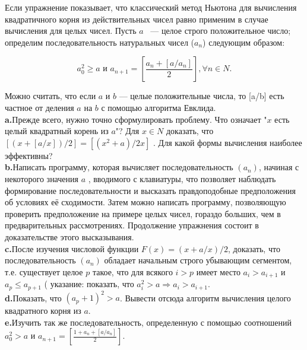 Если упражнение показывает, что классический метод Ньютона для вычисления квадратичного корня из действительных чисел равно применим в случае вычисления для целых чисел. Пусть $a$ ~--- целое строго положительное число; определим последовательность натуральных чисел ($a_{n}$) следующим образом: 

\begin{equation*}
a_0^2 \geqslant {a}  \text{    и     }  a_{n+1} = \left[\frac{a_n+\left[a/a_n\right]}{2}\right], \forall{n} \in {N}.
\end{equation*}

Можно считать, что если $a$ и $b$ --- целые положительные  числа, то [a/b] есть частное от деления $a$ на $b$ с помощью алгоритма Евклида.\newline 
\\
\hspace*{15pt}\textbf{a.}Прежде всего, нужно точно сформулировать проблему. Что означает "$x$ есть целый квадратный корень из $a$"?
Для $x \in{N}$ доказать, что $\left[\left(x+\left[a/x\right]\right)/2\right]=\left[\left(x^{2}+a\right)/2x\right]$ . Для какой формы вычисления наиболее эффективны? \newline
\\
\hspace*{15pt}\textbf{b.}Написать программу, которая вычисляет последовательность $(a_{n})$, начиная с некоторого значения $a$ , вводимого с клавиатуры, что позволяет наблюдать формирование последовательности и высказать правдоподобные предположения об условиях её сходимости. Затем можно написать программу, позволяющую проверить предположение на примере целых чисел, гораздо больших, чем в предварительных рассмотрениях. Продолжение упражнения состоит в доказательстве этого высказывания.\newline
\\
\hspace*{15pt}\textbf{c.}После изучения числовой функции $F\left(x\right)=\left(x+a/x\right)/2$, доказать, что последовательность $\left(a_{n}\right)$ обладает начальным строго убывающим сегментом, т.е. существует  целое $p$ такое, что для всякого $i>p$ имеет место $a_{i}>a_{i+1}$ и $a_{p}\leq{a_{p+1}}$ ( указание: показать, что $a_i^2>a\Rightarrow{a_{i}>a_{i+1}}$.\newline
\\
\hspace*{15pt}\textbf{d.}Показать, что  $\left(a_p+1\right)^2>a$. Вывести отсюда алгоритм вычисления целого квадратного корня из $a$. \newline
\\
\hspace*{15pt}\textbf{e.}Изучить так же последовательность, определенную с помощью соотношений $a_0^2>a$  и 
$ a_{n+1} = \left[\frac{1+a_{n}+\left[a/a_{n}\right]}{2}\right]$.\newline

